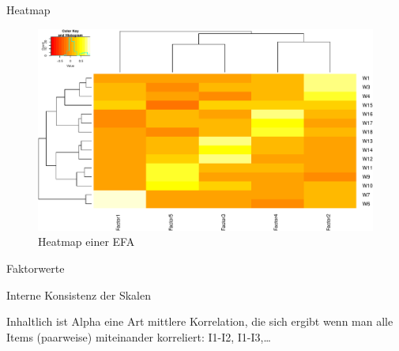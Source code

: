 \begin{frame}{Heatmap}

\begin{figure}

{\centering \includegraphics[width=0.8\linewidth]{PraDa_Folien_nm_2_files/figure-beamer/efa-heatmap-1} 

}

\caption{Heatmap einer EFA}\label{fig:efa-heatmap}
\end{figure}

\end{frame}

\begin{frame}[fragile]{Faktorwerte}

\begin{Shaded}
\begin{Highlighting}[]
\StringTok{ } \NormalTok{, } \NormalTok{)}
\end{Highlighting}
\end{Shaded}

\end{frame}

\begin{frame}[fragile]{Interne Konsistenz der Skalen}

Inhaltlich ist Alpha eine Art mittlere Korrelation, die sich ergibt wenn
man alle Items (paarweise) miteinander korreliert: I1-I2, I1-I3,\ldots{}

\begin{Shaded}
\end{Shaded}

\end{frame}

